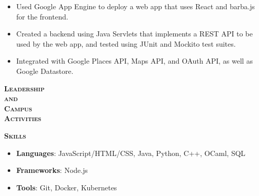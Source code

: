 \documentclass[12pt]{article}
\begin{document}
\begin{minipage}[t]{0.82\textwidth}
\begin{itemize}
    \begin{itemize}
      \item Used Google App Engine to deploy a web app that uses React and
        barba.js for the frontend.
      \item Created a backend using Java Servlets that implements a REST API
        to be used by the web app, and tested using JUnit and Mockito test
        suites.
      \item Integrated with Google Places API, Maps API, and OAuth API, as well
        as Google Datastore.
    \end{itemize}
  \end{itemize}
\end{minipage}

\vspace{0.75em}
{\color{Red} \hrulefill}

\begin{minipage}[t]{0.15\textwidth}\vspace{-0.5em}%
  {\color{Red} \textbf{\textsc{Leadership\\and\\Campus\\Activities}}}
\end{minipage}
\hfill
\begin{minipage}[t]{0.82\textwidth}\vspace{-0.5em}%
  \phantom{why is this needed to prevent warnings?}
\end{minipage}

\vspace{0.75em}
{\color{Red} \hrulefill}

\begin{minipage}[t]{0.15\textwidth}\vspace{-0.5em}%
  {\color{Red} \textbf{\textsc{Skills}}}
\end{minipage}
\hfill
\begin{minipage}[t]{0.82\textwidth}\vspace{-0.5em}%
  \begin{itemize}
    \item \textbf{Languages}: JavaScript/HTML/CSS, Java, Python, C++, OCaml,
      SQL
    \item \textbf{Frameworks}: Node.js
    \item \textbf{Tools}: Git, Docker, Kubernetes
  \end{itemize}
\end{minipage}
\end{document}
